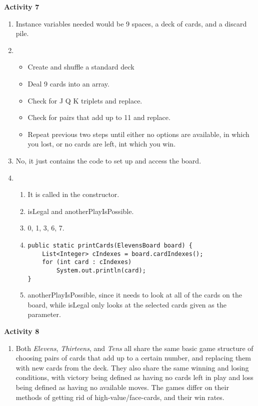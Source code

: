 \message{ !name(questions.tex)}\documentclass[12pt]{article}
\begin{document}
\textbf{Activity 7}
\begin{enumerate}
\item Instance variables needed would be 9 spaces, a deck of cards, and a
  discard pile. 
\item \begin{itemize}
      \item Create and shuffle a standard deck
      \item Deal 9 cards into an array.
      \item Check for J Q K triplets and replace.
      \item Check for pairs that add up to 11 and replace.
      \item Repeat previous two steps until either no options are available, in
        which you lost, or no cards are left, int which you win.
      \end{itemize}
\item No, it just contains the code to set up and access the board.
\item \begin{enumerate}
      \item It is called in the constructor.
      \item isLegal and anotherPlayIsPossible.
      \item 0, 1, 3, 6, 7.
      \item
      \begin{verbatim}
public static printCards(ElevensBoard board) {
    List<Integer> cIndexes = board.cardIndexes();
    for (int card : cIndexes)
        System.out.println(card);
}
      \end{verbatim}
      \item anotherPlayIsPossible, since it needs to look at all of the cards on
        the board, while isLegal only looks at the selected cards given as the parameter.
      \end{enumerate}
\end{enumerate}

\textbf{Activity 8}
\begin{enumerate}
\item Both \textit{Elevens}, \textit{Thirteens}, and \textit{Tens} all share the
  same basic game structure of choosing pairs of cards that add up to a certain
  number, and replacing them with new cards from the deck. They also share the
  same winning and losing conditions, with victory being defined as having no
  cards left in play and loss being defined as having no available moves. The
  games differ on their methods of getting rid of high-value/face-cards, and
  their win rates.
\end{enumerate}
\end{document}
